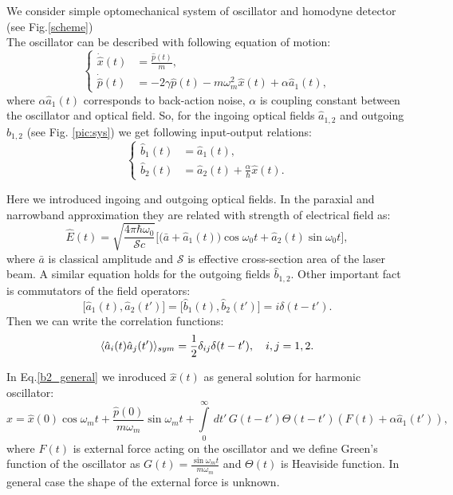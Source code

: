 We consider simple optomechanical system of oscillator and homodyne detector (see Fig.\ref{scheme})\\
The oscillator can be described with following equation of motion:
\begin{equation}
\begin{cases}
 \dot{\hat{x}}(t) &= \frac{\hat{p}(t)}{m},\\
 \dot{\hat{p}}(t) &= -2\gamma \hat{p}(t) - m\omega_m^2 \hat{x}(t) + \alpha \hat{a}_1(t),
\end{cases}
\end{equation}
where $\alpha \hat{a}_1(t)$ corresponds to back-action noise, $\alpha$ is coupling constant between the oscillator and optical field.
So, for the ingoing optical fields $\hat{a}_{1,2}$ and outgoing $\hat{b}_{1,2}$ (see Fig. \ref{pic:sys}) we get following input-output relations:
\begin{equation}
\begin{cases}
 \hat{b}_1(t) &= \hat{a}_1(t),\\
 \hat{b}_2(t) &= \hat{a}_2(t) + \frac{\alpha}{\hbar}\hat{x}(t)\label{b2_general}.
\end{cases}
\end{equation}

Here we introduced ingoing and outgoing optical fields. In the paraxial and narrowband approximation they are related with strength of electrical field as:
\begin{equation}
 \hat{E}(t) = \sqrt{\frac{4\pi \hbar\omega_0}{\mathcal{S} c}} \bigl[\bigl(\bar{a}+\hat{a}_1(t)\bigr)\cos\omega_0t + \hat{a}_2(t)\sin\omega_0t\bigr],
\end{equation}
where $\bar{a}$ is classical amplitude and $\mathcal{S}$ is effective cross-section area of the laser beam. A similar equation holds for the outgoing fields $\hat{b}_{1,2}$.
Other important fact is commutators of the field operators:
\begin{equation}
 \bigl[\hat{a}_1(t),\hat{a}_2(t')\bigl] = \bigl[\hat{b}_1(t),\hat{b}_2(t')\bigl] = i \delta(t-t').
\end{equation}
Then we can write the correlation functions:
\begin{equation}
 \langle\hat{a}_i(t) \hat{a}_j(t')\rangle_{sym} = \frac{1}{2}\delta_{ij}\delta(t-t'), \quad i,j=1,2.
\end{equation}

In Eq.\ref{b2_general} we inroduced $\hat{x}(t)$ as general solution for harmonic oscillator: 
\begin{equation}\label{sol_osc}
  \hat{x} = \hat{x}(0) \cos \omega_m t+ \frac{\hat{p}(0)}{m \omega_m} \sin \omega_m t + \int\limits_0^\infty \, dt' \, G(t-t')\Theta(t-t')(F(t)+\alpha \hat{a}_1(t')),
\end{equation}
where $F(t)$ is external force acting on the oscillator and we define Green's function of the oscillator as $G(t)=\frac{\sin \omega_m t}{m \omega_m}$ and $\Theta(t)$ is Heaviside function.
In general case the shape of the external force is unknown.

